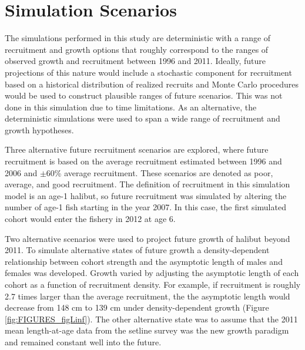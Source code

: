 
\section{Simulation Scenarios} %
\label{sec:simulation_scenarios}

The simulations performed in this study are deterministic with a range of recruitment and growth options that roughly correspond to the ranges of observed growth and recruitment between 1996 and 2011.  Ideally, future projections of this nature would include a stochastic component for recruitment based on a historical distribution of realized recruits and Monte Carlo procedures would be used to construct plausible ranges of future scenarios. This was not done in this simulation due to time limitations.  As an alternative, the deterministic simulations were used to span a wide range of recruitment and growth hypotheses.


Three alternative future recruitment scenarios are explored, where future recruitment is based on the average recruitment estimated between 1996 and 2006 and $\pm$60\% average recruitment.  These scenarios are denoted as poor, average, and good recruitment.  The definition of recruitment in this simulation model is an age-1 halibut, so future recruitment was simulated by altering the number of age-1 fish starting in the year 2007. In this case, the first simulated cohort would enter the fishery in 2012 at age 6.


Two alternative scenarios were used to project future growth of halibut beyond 2011.  To simulate alternative states of future growth a density-dependent relationship between cohort strength and the asymptotic length of males and females was developed.  Growth varied by adjusting the asymptotic length of each cohort as a function of recruitment density. For example, if recruitment is roughly 2.7 times larger than the average recruitment, the the asymptotic length would decrease from 148 cm to 139 cm under density-dependent growth (Figure \ref{fig:FIGURES_figLinf}).  The other alternative state was to assume that the 2011 mean length-at-age data from the setline survey was the new growth paradigm and remained constant well into the future. 

